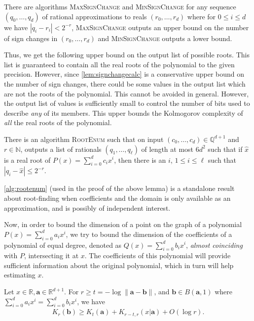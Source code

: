 \documentclass[a4paper,UKenglish,cleveref,autoref,thm-restate]{lipics-v2021}
\newcommand{\N}{\mathbb{N}}
\newcommand{\Q}{\mathbb{Q}}
\begin{document}
\begin{lemma}\label{lem:signchangecalc}
  There are algorithms \textsc{MaxSignChange} and
  \textsc{MinSignChange} for any sequence $(q_0, \dots, q_d)$ of
  rational approximations to reals $(r_0, \dots, r_d)$ where for $0
  \le i \le d$ we have $|q_i - r_i| < 2^{-r}$, \textsc{MaxSignChange}
  outputs an upper bound on the number of sign changes in $(r_0,
  \dots, r_d)$ and \textsc{MinSignChange} outputs a lower bound.
\end{lemma}
Thus, we get the following upper bound on the output list of possible
roots. This list is guaranteed to contain all the real roots of the
polynomial to the given precision. However, since
\cref{lem:signchangecalc} is a conservative upper bound on the number
of sign changes, there could be some values in the output list which
are not the roots of the polynomial. This cannot be avoided in
general. However, the output list of values is sufficiently small to
control the number of bits used to describe \emph{any} of its members.
This upper bounds the Kolmogorov complexity of \emph{all} the real
roots of the polynomial.
\begin{lemma}\label{lem:rootenum}
  There is an algorithm \textsc{RootEnum} such that on input
  $(c_0,\dots,c_d)\in\Q^{d+1}$ and $r\in\N$, outputs a list of
  rationals $(q_1,\dots,q_\ell)$ of length at most $6d^2$ such that if
  $\hat{x}$ is a real root of $P(x)=\sum_{i=0}^d c_i x^i$, then there
  is an $i$, $1 \le i \le \ell$ such that $|q_i - \hat{x}|\le 2^{-r}$.
\end{lemma}
\begin{remark}
	\cref{alg:rootenum} (used in the proof of the above lemma) is a standalone result about root-finding when coefficients and the domain is only available as an approximation, and is possibly of independent interest. 
\end{remark}
Now, in order to bound the dimension of a point on the graph of a
polynomial $P(x)=\sum_{i=0}^d a_ix^i$, we try to bound the dimension
of the coefficients of a polynomial of equal degree, denoted as
$Q(x)=\sum_{i=0}^d b_ix^i$, \textit{almost coinciding} with $P$,
intersecting it at $x$. The coefficients of this polynomial will
provide sufficient information about the original polynomial, which in
turn will help estimating $x$.
\begin{theorem}\label{lem:errbound}
  Let $x\in\mathbb{R},\mathbf{a}\in\mathbb{R}^{d+1}$. For
  $r\geq t=-\log\|\mathbf{a}-\mathbf{b}\|$, and
  $\mathbf{b}\in B(\mathbf{a},1)$ where
  $\sum_{i=0}^da_ix^i=\sum_{i=0}^db_ix^i$, we have
  \begin{align*}
    K_r(\mathbf{b})\geq K_t(\mathbf{a})+K_{r-t,r}(x|\mathbf{a})+
    O(\log r).
  \end{align*}
\end{theorem}
\end{document}
